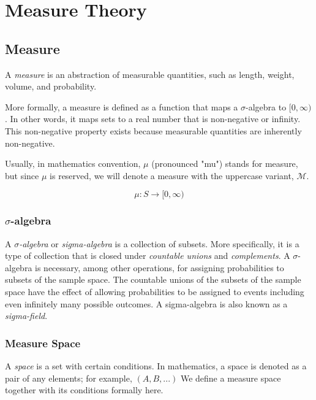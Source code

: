 \documentclass{article}
\begin{document}
\newpage
\section{Measure Theory}

\subsection{Measure}

A \emph{measure} is an abstraction of measurable quantities, such as length, weight, volume, and probability.

More formally, a measure is defined as a function that maps a $\sigma$-algebra to $[0,\infty)$. In other words, it maps sets to a real number that is non-negative or infinity. This non-negative property exists because measurable quantities are inherently non-negative.

Usually, in mathematics convention, $\mu$ (pronounced "mu") stands for measure, but since $\mu$ is reserved, we will denote a measure with the uppercase variant, $\mathcal{M}$. 

$$\mu: S \rightarrow [0,\infty)$$

\subsubsection{$\sigma$-algebra}

A \emph{$\sigma$-algebra} or \emph{sigma-algebra} is a collection of subsets. More specifically, it is a type of collection that is closed under \emph{countable unions} and \emph{complements}. A $\sigma$-algebra is necessary, among other operations, for assigning probabilities to subsets of the sample space. The countable unions of the subsets of the sample space have the effect of allowing probabilities to be assigned to events including even infinitely many possible outcomes. A sigma-algebra is also known as a \emph{sigma-field}.


\subsubsection{Measure Space}

A \emph{space} is a set with certain conditions. In mathematics, a space is denoted as a pair of any elements; for example, $(A,B,...)$  We define a measure space together with its conditions formally here.
\end{document}
